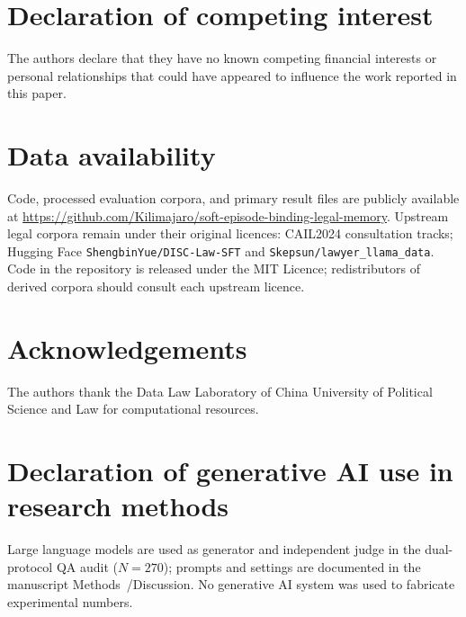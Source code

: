 \documentclass[preprint,12pt,authoryear]{elsarticle}
\begin{document}
\section*{Declaration of competing interest}
The authors declare that they have no known competing financial interests or personal relationships that could have appeared to influence the work reported in this paper.

\section*{Data availability}
Code, processed evaluation corpora, and primary result files are publicly available at
\url{https://github.com/Kilimajaro/soft-episode-binding-legal-memory}.
Upstream legal corpora remain under their original licences: CAIL2024 consultation tracks; Hugging Face \texttt{ShengbinYue/DISC-Law-SFT} and \texttt{Skepsun/lawyer\_llama\_data}.
Code in the repository is released under the MIT Licence; redistributors of derived corpora should consult each upstream licence.

\section*{Acknowledgements}
The authors thank the Data Law Laboratory of China University of Political Science and Law for computational resources.

\section*{Declaration of generative AI use in research methods}
Large language models are used as generator and independent judge in the dual-protocol QA audit ($N{=}270$); prompts and settings are documented in the manuscript Methods~/Discussion. No generative AI system was used to fabricate experimental numbers.
\end{document}
